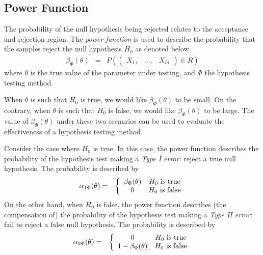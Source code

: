 \subsection{Power Function}

The probability of the null hypothesis being rejected relates to the acceptance and rejection region. The \textit{power function} is used to describe the probability that the samples reject the null hypothesis $H_0$ as denoted below.
\begin{eqnarray}
	\beta_\Phi(\theta) &=& P\left(\left(\begin{array}{ccc}
		X_1, & \ldots, & X_m
	\end{array}\right)\in R\right) \nonumber
\end{eqnarray}
where $\theta$ is the true value of the parameter under testing, and $\Phi$ the hypothesis testing method.

When $\theta$ is such that $H_0$ is true, we would like $\beta_\Phi(\theta)$ to be small. On the contrary, when $\theta$ is such that $H_0$ is false, we would like $\beta_\Phi(\theta)$ to be large. The value of $\beta_\Phi(\theta)$ under these two scenarios can be used to evaluate the effectiveness of a hypothesis testing method.

Consider the case where $H_0$ is true. In this case, the power function describes the probability of the hypothesis test making a \textit{Type I error}: reject a true null hypothesis. The probability is described by
\begin{eqnarray}
	\alpha_{1\Phi}(\theta) &=& \left\{\begin{array}{cc}
		\beta_\Phi(\theta) & H_0 \textup{~is true} \\
		0 & H_0 \textup{~is false}
	\end{array}\right. \label{eq:hypotestalpha1}
\end{eqnarray}
On the other hand, when $H_0$ is false, the power function describes (the compensation of) the probability of the hypothesis test making a \textit{Type II error}: fail to reject a false null hypothesis. The probability is described by
\begin{eqnarray}
	\alpha_{2\Phi}(\theta) &=& \left\{\begin{array}{cc}
		0 & H_0 \textup{~is true} \\
		1-\beta_\Phi(\theta) & H_0 \textup{~is false}
	\end{array}\right. \label{eq:hypotestalpha2}
\end{eqnarray}

